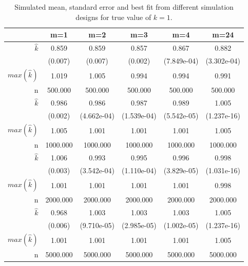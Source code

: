 \documentclass[12pt]{article}
\theoremstyle{definition}
\begin{document}
\begin{table}[]
    \centering
\begin{tabular}{r|ccccc}
\toprule
               & m=1      & m=2         & m=3         & m=4         & m=24        \\ \hline
     $\hat{k}$ &    0.859 &       0.859 &       0.857 &       0.867 &       0.882 \\
               &  (0.007) &     (0.007) &     (0.002) & (7.849e-04) & (3.302e-04) \\
$max(\hat{k})$ &    1.019 &       1.005 &       0.994 &       0.994 &       0.991 \\
             n &  500.000 &     500.000 &     500.000 &     500.000 &     500.000 \\ \hline
     $\hat{k}$ &    0.986 &       0.986 &       0.987 &       0.989 &       1.005 \\
               &  (0.002) & (4.662e-04) & (1.539e-04) & (5.542e-05) & (1.237e-16) \\
$max(\hat{k})$ &    1.005 &       1.001 &       1.001 &       1.001 &       1.005 \\
             n & 1000.000 &    1000.000 &    1000.000 &    1000.000 &    1000.000 \\ \hline
     $\hat{k}$ &    1.006 &       0.993 &       0.995 &       0.996 &       0.998 \\
               &  (0.003) & (3.542e-04) & (1.110e-04) & (3.829e-05) & (1.031e-16) \\
$max(\hat{k})$ &    1.001 &       1.001 &       1.001 &       1.001 &       0.998 \\
             n & 2000.000 &    2000.000 &    2000.000 &    2000.000 &    2000.000 \\ \hline
         $\hat{k}$ &    0.968 &       1.003 &       1.003 &       1.003 &       1.005 \\
               &  (0.006) & (9.710e-05) & (2.985e-05) & (1.002e-05) & (1.237e-16) \\
$max(\hat{k})$ &    1.001 &       1.001 &       1.001 &       1.001 &       1.005 \\
             n & 5000.000 &    5000.000 &    5000.000 &    5000.000 &    5000.000 \\
\bottomrule
\end{tabular}
\caption{Simulated mean, standard error and best fit from different simulation designs for true value of $k=1$.}
\end{table}
\end{document}
